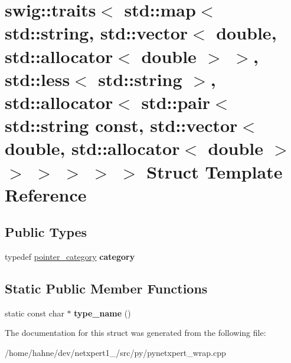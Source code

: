 \hypertarget{structswig_1_1traits_3_01std_1_1map_3_01std_1_1string_00_01std_1_1vector_3_01double_00_01std_1_1c538c8e042ed07ca5e198eb40244e9aa}{}\section{swig\+:\+:traits$<$ std\+:\+:map$<$ std\+:\+:string, std\+:\+:vector$<$ double, std\+:\+:allocator$<$ double $>$ $>$, std\+:\+:less$<$ std\+:\+:string $>$, std\+:\+:allocator$<$ std\+:\+:pair$<$ std\+:\+:string const, std\+:\+:vector$<$ double, std\+:\+:allocator$<$ double $>$ $>$ $>$ $>$ $>$ $>$ Struct Template Reference}
\label{structswig_1_1traits_3_01std_1_1map_3_01std_1_1string_00_01std_1_1vector_3_01double_00_01std_1_1c538c8e042ed07ca5e198eb40244e9aa}
\subsection*{Public Types}
\begin{DoxyCompactItemize}
\item 
typedef \hyperlink{structswig_1_1pointer__category}{pointer\+\_\+category} {\bfseries category}\hypertarget{structswig_1_1traits_3_01std_1_1map_3_01std_1_1string_00_01std_1_1vector_3_01double_00_01std_1_1c538c8e042ed07ca5e198eb40244e9aa_a3ab86764e8dd750e9ac442b8d91de9a8}{}\label{structswig_1_1traits_3_01std_1_1map_3_01std_1_1string_00_01std_1_1vector_3_01double_00_01std_1_1c538c8e042ed07ca5e198eb40244e9aa_a3ab86764e8dd750e9ac442b8d91de9a8}

\end{DoxyCompactItemize}
\subsection*{Static Public Member Functions}
\begin{DoxyCompactItemize}
\item 
static const char $\ast$ {\bfseries type\+\_\+name} ()\hypertarget{structswig_1_1traits_3_01std_1_1map_3_01std_1_1string_00_01std_1_1vector_3_01double_00_01std_1_1c538c8e042ed07ca5e198eb40244e9aa_a1115d8b168d49c6d4551f3f350719a3a}{}\label{structswig_1_1traits_3_01std_1_1map_3_01std_1_1string_00_01std_1_1vector_3_01double_00_01std_1_1c538c8e042ed07ca5e198eb40244e9aa_a1115d8b168d49c6d4551f3f350719a3a}

\end{DoxyCompactItemize}


The documentation for this struct was generated from the following file\+:\begin{DoxyCompactItemize}
\item 
/home/hahne/dev/netxpert1\+\_/src/py/pynetxpert\+\_\+wrap.\+cpp\end{DoxyCompactItemize}

